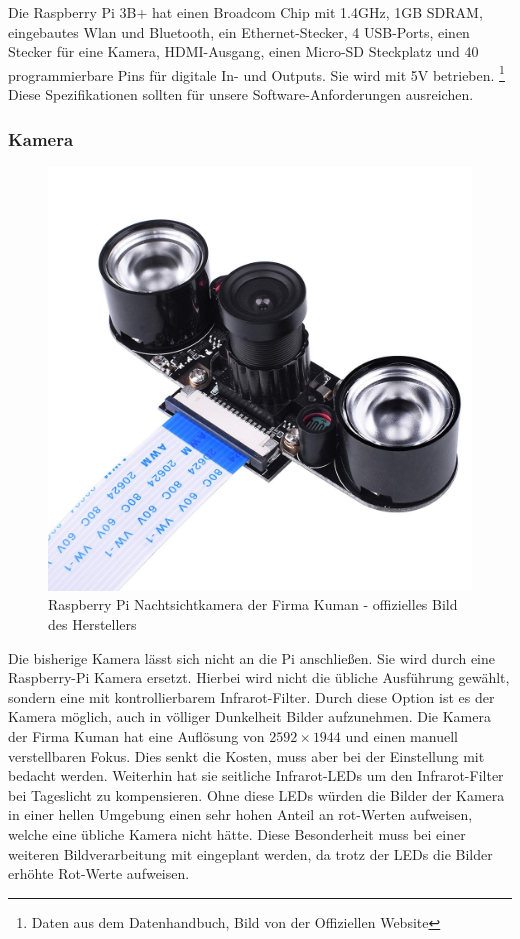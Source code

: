 \documentclass[twoside,11pt, a4paper]{report}
\begin{document}
	Die Raspberry Pi 3B+ hat einen Broadcom Chip mit 1.4GHz, 1GB SDRAM, eingebautes Wlan und Bluetooth, ein Ethernet-Stecker, 4 USB-Ports, einen Stecker für eine Kamera, HDMI-Ausgang, einen Micro-SD Steckplatz und 40 programmierbare Pins für digitale In- und Outputs. Sie wird mit 5V betrieben. \footnote{Daten aus dem Datenhandbuch, Bild von der Offiziellen Website}\\
	Diese Spezifikationen sollten für unsere Software-Anforderungen ausreichen. 
	
	\subsubsection{Kamera}
	
	\begin{figure}[!htb]
		\centering
		\includegraphics[scale=0.1]{images/Kuman_Kamera.jpg}
		\caption{Raspberry Pi Nachtsichtkamera der Firma Kuman - offizielles Bild des Herstellers}
	\end{figure}
	
	Die bisherige Kamera lässt sich nicht an die Pi anschließen. Sie wird durch eine Raspberry-Pi Kamera ersetzt. Hierbei wird nicht die übliche Ausführung gewählt, sondern eine mit kontrollierbarem Infrarot-Filter. Durch diese Option ist es der Kamera möglich, auch in völliger Dunkelheit Bilder aufzunehmen. Die Kamera der Firma Kuman hat eine Auflösung von $2592 \times 1944$ und einen manuell verstellbaren Fokus. Dies senkt die Kosten, muss aber bei der Einstellung mit bedacht werden. Weiterhin hat sie seitliche Infrarot-LEDs um den Infrarot-Filter bei Tageslicht zu kompensieren. Ohne diese LEDs würden die Bilder der Kamera in einer hellen Umgebung einen sehr hohen Anteil an rot-Werten aufweisen, welche eine übliche Kamera nicht hätte. Diese Besonderheit muss bei einer weiteren Bildverarbeitung mit eingeplant werden, da trotz der LEDs die Bilder erhöhte Rot-Werte aufweisen. 
	
\end{document}
